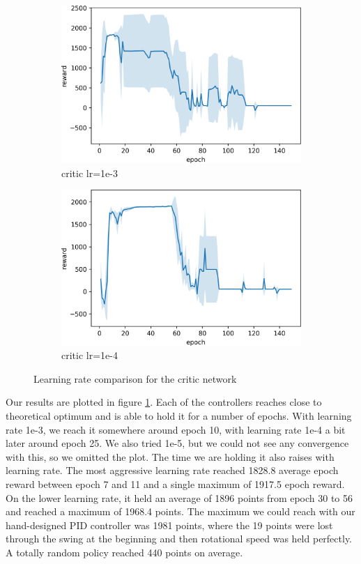 \documentclass[hyperref,final,beleg]{cgvpub}
\begin{document}
\begin{figure}
\centering
\begin{subfigure}{.5\textwidth}
  \centering
  \includegraphics[width=.8\linewidth]{images/plot_critic_1e-3.png}
  \caption{critic lr=1e-3}
\end{subfigure}%
\begin{subfigure}{.5\textwidth}
  \centering
  \includegraphics[width=.8\linewidth]{images/plot_critic_1e-4.png}
  \caption{critic lr=1e-4}
\end{subfigure}
\caption{Learning rate comparison for the critic network}
\label{fig:critic_lr}
\end{figure}

Our results are plotted in figure \ref{fig:critic_lr}. Each of the controllers reaches close to theoretical optimum and is able to hold it for a number of epochs. With learning rate 1e-3, we reach it somewhere around epoch 10, with learning rate 1e-4 a bit later around epoch 25. We also tried 1e-5, but we could not see any convergence with this, so we omitted the plot. The time we are holding it also raises with learning rate. The most aggressive learning rate reached 1828.8 average epoch reward between epoch 7 and 11 and a single maximum of 1917.5 epoch reward. On the lower learning rate, it held an average of 1896 points from epoch 30 to 56 and reached a maximum of 1968.4 points. The maximum we could reach with our hand-designed PID controller was 1981 points, where the 19 points were lost through the swing at the beginning and then rotational speed was held perfectly. A totally random policy reached 440 points on average.
\end{document}
